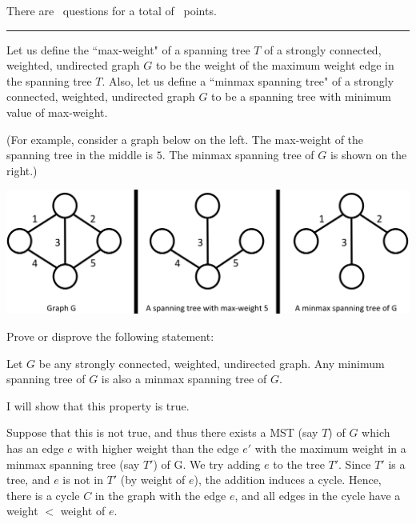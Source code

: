 \documentclass[answers]{exam}
\begin{document}
\vspace{0.1in}


\vspace{0.1in}
There are \numquestions\, questions for a total of \numpoints\, points.
\vspace{0.1in}
\hrule
 \vspace{0.2in}
\begin{questions}
 
\question[3] 
Let us define the ``max-weight" of a spanning tree $T$ of a strongly connected, weighted, undirected graph $G$ to be the weight of the maximum weight edge in the spanning tree $T$. Also, let us define
    a ``minmax spanning tree" of a strongly connected, weighted, undirected graph $G$ to be a spanning tree with minimum value of max-weight.

(For example, consider a graph below on the left. The max-weight of the spanning tree in the middle is $5$. The minmax spanning tree of $G$ is shown on the right.)

    \begin{center}
        \includegraphics[scale=0.2]{img/minmax.png}
    \end{center}

Prove or disprove the following statement: 

    Let $G$ be any strongly connected, weighted, undirected graph. Any minimum spanning tree of $G$ is also a minmax spanning tree of $G$.

    \begin{solution}

        I will show that this property is true.

        Suppose that this is not true, and thus there exists a MST (say $T$) of $G$ which has an edge $e$ with higher weight than the edge $e'$ with the maximum weight in a minmax spanning tree (say
        $T'$) of G. We try adding $e$ to the tree $T'$. Since $T'$ is a tree, and $e$ is not in $T'$ (by weight of $e$), the addition induces a cycle. Hence, there is a cycle $C$ in the graph with the
        edge $e$, and all edges in the cycle have a weight $<$ weight of $e$.


\end{solution}
\end{questions}
\end{document}
